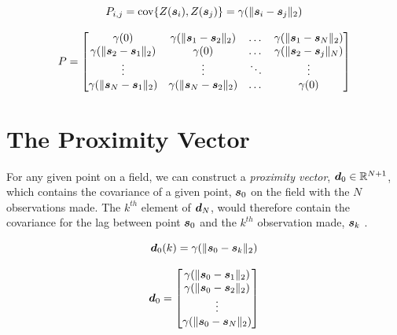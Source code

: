 \begin{equation}
    P_{i,j} = \text{cov}\{Z({\it{\boldsymbol{s}}}_{i}), Z({\it{\boldsymbol{s}}}_{j})\} = \gamma(\| {\it{\boldsymbol{s}}}_i - {\it{\boldsymbol{s}}}_j \|_2)
    \label{eq:covvarmatelem}
\end{equation}

\begin{equation}
    P = \begin{bmatrix} 

    \gamma(0) & \gamma(\| {\it{\boldsymbol{s}}}_1 - {\it{\boldsymbol{s}}}_2 \|_2) & \dots & \gamma(\| {\it{\boldsymbol{s}}}_1 - {\it{\boldsymbol{s}}}_N \|_2)\\
    
    \gamma(\| {\it{\boldsymbol{s}}}_2 - {\it{\boldsymbol{s}}}_1 \|_2) & \gamma(0) & \dots & \gamma(\| {\it{\boldsymbol{s}}}_2 - {\it{\boldsymbol{s}}}_j \|_N)\\

    \vdots & \vdots & \ddots & \vdots \\
    
    \gamma(\| {\it{\boldsymbol{s}}}_N - {\it{\boldsymbol{s}}}_1 \|_2) & \gamma(\| {\it{\boldsymbol{s}}}_N - {\it{\boldsymbol{s}}}_2 \|_2) & \dots & \gamma(0)\\

    \end{bmatrix}
    \label{eq:covvarmat}
\end{equation}

\section{The Proximity Vector} \label{sec:proxvect}
For any given point on a field, we can construct a \textit{proximity vector}, ${\it{\boldsymbol{d}}}_0 \in \mathbb{R}^{N+1}$, which contains the covariance of a given point, ${\it{\boldsymbol{s}}}_0$ on the field with the $N$ observations made. The $k^{th}$ element of ${\it{\boldsymbol{d}}}_N$, would therefore contain the covariance for the lag between point ${\it{\boldsymbol{s}}}_0$ and the $k^{th}$ observation made, ${\it{\boldsymbol{s}}}_k$ \cite{matheron:geostat}.

$${\it{\boldsymbol{d}}}_0(k) = \gamma(\| {\it{\boldsymbol{s}}}_0 - {\it{\boldsymbol{s}}}_k \|_2)$$

\begin{equation}
    {\it{\boldsymbol{d}}}_0 =
        \begin{bmatrix} 
                    \gamma(\| {\it{\boldsymbol{s}}}_0 - {\it{\boldsymbol{s}}}_1 \|_2) \\
                    \gamma(\| {\it{\boldsymbol{s}}}_0 - {\it{\boldsymbol{s}}}_2 \|_2) \\
                     \vdots \\
                    \gamma(\| {\it{\boldsymbol{s}}}_0 - {\it{\boldsymbol{s}}}_N \|_2) \\
        \end{bmatrix} 
    \label{eq:proxvect}
\end{equation}

